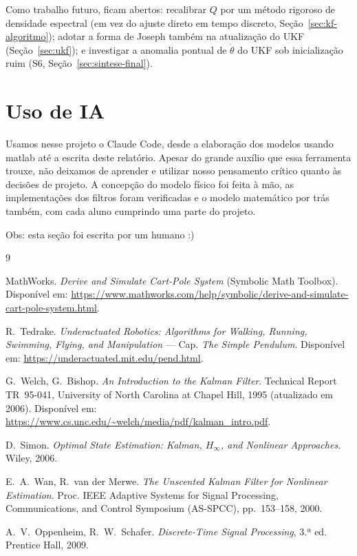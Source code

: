 \documentclass[brazil, 12pt]{article}
\begin{document}
Como trabalho futuro, ficam abertos: recalibrar $Q$ por um método rigoroso de
densidade espectral (em vez do ajuste direto em tempo discreto,
Seção~\ref{sec:kf-algoritmo}); adotar a forma de Joseph também na atualização
do UKF (Seção~\ref{sec:ukf}); e investigar a anomalia pontual de $\dot\theta$
do UKF sob inicialização ruim (S6, Seção~\ref{sec:sintese-final}).


\section{Uso de IA}

Usamos nesse projeto o Claude Code, desde a elaboração dos modelos usando matlab até a escrita deste relatório.
Apesar do grande auxílio que essa ferramenta trouxe, não deixamos de aprender e utilizar nosso pensamento crítico quanto às decisões de projeto. A concepção do modelo físico foi feita à mão, as implementações dos filtros foram verificadas e o modelo matemático por trás também, com cada aluno cumprindo uma parte do projeto. 

Obs: esta seção foi escrita por um humano :)
\begin{thebibliography}{9}

MathWorks. \emph{Derive and Simulate Cart-Pole System} (Symbolic Math Toolbox).
Disponível em:
\url{https://www.mathworks.com/help/symbolic/derive-and-simulate-cart-pole-system.html}.

R.~Tedrake. \emph{Underactuated Robotics: Algorithms for Walking, Running,
Swimming, Flying, and Manipulation} --- Cap. \emph{The Simple Pendulum}.
Disponível em: \url{https://underactuated.mit.edu/pend.html}.

G.~Welch, G.~Bishop. \emph{An Introduction to the Kalman Filter}. Technical
Report TR~95-041, University of North Carolina at Chapel Hill, 1995
(atualizado em 2006). Disponível em:
\url{https://www.cs.unc.edu/~welch/media/pdf/kalman_intro.pdf}.

D.~Simon. \emph{Optimal State Estimation: Kalman, $H_\infty$, and Nonlinear
Approaches}. Wiley, 2006.

E.~A.~Wan, R.~van der Merwe. \emph{The Unscented Kalman Filter for Nonlinear
Estimation}. Proc. IEEE Adaptive Systems for Signal Processing, Communications,
and Control Symposium (AS-SPCC), pp.~153--158, 2000.

A.~V.~Oppenheim, R.~W.~Schafer. \emph{Discrete-Time Signal Processing}, 3.ª
ed. Prentice Hall, 2009.

\end{thebibliography}
\end{document}
